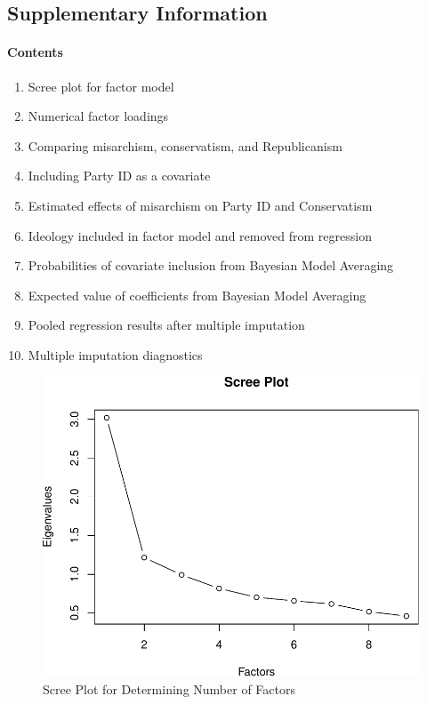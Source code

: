 \documentclass[12pt,]{article}
\providecommand{\tightlist}{%
  \setlength{\itemsep}{0pt}\setlength{\parskip}{0pt}}
\let\oldparagraph\paragraph
\renewcommand{\paragraph}[1]{\oldparagraph{#1}\mbox{}}
\begin{document}
\pagebreak

\subsection{Supplementary Information}\label{supplementary-information}

\paragraph{Contents}\label{contents}

\begin{enumerate}
\def\labelenumi{\arabic{enumi}.}
\tightlist
\item
  Scree plot for factor model
\item
  Numerical factor loadings
\item
  Comparing misarchism, conservatism, and Republicanism
\item
  Including Party ID as a covariate
\item
  Estimated effects of misarchism on Party ID and Conservatism
\item
  Ideology included in factor model and removed from regression
\item
  Probabilities of covariate inclusion from Bayesian Model Averaging
\item
  Expected value of coefficients from Bayesian Model Averaging
\item
  Pooled regression results after multiple imputation
\item
  Multiple imputation diagnostics
\end{enumerate}

\begin{figure}[htbp]
\centering
\includegraphics{figures/scree-1.pdf}
\caption{Scree Plot for Determining Number of Factors}
\end{figure}
\end{document}
